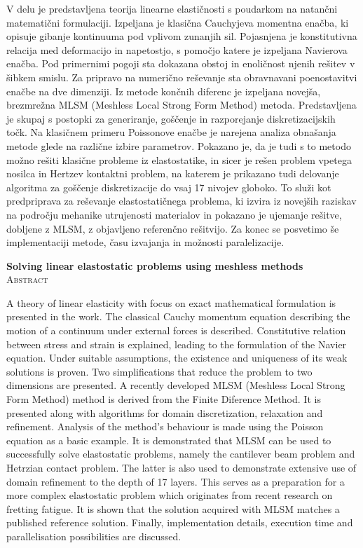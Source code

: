 \documentclass[12pt,a4paper,twoside]{article}
\theoremstyle{definition} %
\theoremstyle{plain} %
\numberwithin{equation}{section}
\begin{document}
V delu je predstavljena teorija linearne elastičnosti s poudarkom na natančni matematični
formulaciji. Izpeljana je klasična Cauchyjeva momentna enačba, ki opisuje gibanje kontinuuma pod
vplivom zunanjih sil. Pojasnjena je konstitutivna relacija med deformacijo in napetostjo, s pomočjo
katere je izpeljana Navierova enačba. Pod primernimi pogoji sta dokazana obstoj in enoličnost njenih
rešitev v šibkem smislu. Za pripravo na numerično reševanje sta obravnavani poenostavitvi enačbe na
dve dimenziji. Iz metode končnih diferenc je izpeljana novejša, brezmrežna MLSM (Meshless Local
Strong Form Method) metoda. Predstavljena je skupaj s postopki za generiranje, goščenje in
razporejanje diskretizacijskih točk.  Na klasičnem primeru Poissonove enačbe je narejena analiza
obnašanja metode glede na različne izbire parametrov. Pokazano je, da je tudi s to metodo možno
rešiti klasične probleme iz elastostatike, in sicer je rešen problem vpetega nosilca in Hertzev
kontaktni problem, na katerem je prikazano tudi delovanje algoritma za goščenje diskretizacije do
vsaj 17 nivojev globoko. To služi kot predpriprava za reševanje elastostatičnega problema, ki izvira
iz novejših raziskav na področju mehanike utrujenosti materialov in pokazano je ujemanje rešitve,
dobljene z MLSM, z objavljeno referenčno rešitvijo. Za konec se posvetimo še implementaciji metode,
času izvajanja in možnosti paralelizacije.

\vfill
\begin{center}
\textbf{Solving linear elastostatic problems using meshless methods}\\[3mm] %
\textsc{Abstract} \\[2mm]
\end{center}

A theory of linear elasticity with focus on exact mathematical formulation is presented in the work.
The classical Cauchy momentum equation describing the motion of a continuum under external forces is
described. Constitutive relation between stress and strain is explained, leading to the formulation
of the Navier equation. Under suitable assumptions, the existence and uniqueness of its weak
solutions is proven. Two simplifications that reduce the problem to two dimensions are presented. A
recently developed MLSM (Meshless Local Strong Form Method) method is derived from the Finite
Diference Method.  It is presented along with algorithms for domain discretization, relaxation and
refinement. Analysis of the method's behaviour is made using the Poisson equation as a basic
example. It is demonstrated that MLSM can be used to successfully solve elastostatic problems,
namely the cantilever beam problem and Hetrzian contact problem. The latter is also used to
demonstrate extensive use of domain refinement to the depth of 17 layers. This serves as a
preparation for a more complex elastostatic problem which originates from recent research on
fretting fatigue.  It is shown that the solution acquired with MLSM matches a published reference
solution.  Finally, implementation details, execution time and parallelisation possibilities are
discussed.
\end{document}
